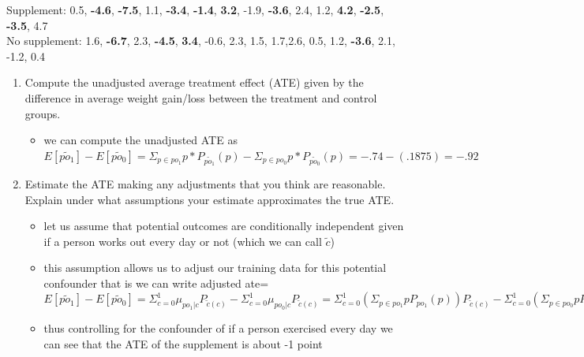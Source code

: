 \documentclass[12pt,twoside]{article}
\begin{document}
\begin{enumerate}
Supplement: 0.5, \textbf{-4.6}, \textbf{-7.5}, 1.1, \textbf{-3.4}, \textbf{-1.4}, \textbf{3.2}, -1.9, \textbf{-3.6}, 2.4, 1.2, \textbf{4.2}, \textbf{-2.5}, \textbf{-3.5}, 4.7 \\ 
No supplement: 1.6, \textbf{-6.7}, 2.3, \textbf{-4.5}, \textbf{3.4}, -0.6, 2.3, 1.5, 1.7,2.6, 0.5, 1.2, \textbf{-3.6}, 2.1, -1.2, 0.4
\begin{enumerate}
\item Compute the unadjusted average treatment effect (ATE) given by the difference in average weight gain/loss between the treatment and control groups. 
\begin{itemize}
    \item  we can compute the unadjusted ATE as $E[\tilde{po_{1}}]-E[\tilde{po_{0}}]=\Sigma_{p\in po_1}p*P_{\tilde{po_{1}}}(p)-\Sigma_{p\in po_0}p*P_{\tilde{po_{0}}}(p)=-.74-(.1875)=-.92$
\end{itemize}

\item Estimate the ATE making any adjustments that you think are reasonable. Explain under what assumptions your estimate approximates the true ATE. 
\begin{itemize}
    \item let us assume that potential outcomes are conditionally independent given if a person works out every day or not (which we can call $\tilde{c}$)
    \item this assumption allows us to adjust our training data for this potential confounder that is we can write adjusted ate= $E[\tilde{po_{1}}]-E[\tilde{po_{0}}]=\Sigma_{c=0}^{1}\mu_{po_1|c}P_{\tilde{c}(c)}-\Sigma_{c=0}^{1}\mu_{po_0|c}P_{\tilde{c}(c)}=\Sigma_{c=0}^{1}(\Sigma_{p\in po_1}pP_{po_1}(p))P_{\tilde{c}(c)}-\Sigma_{c=0}^{1}(\Sigma_{p\in po_0}pP_{po_0}(p))P_{\tilde{c}(c)}=\frac{13}{31}(-2.12)+\frac{18}{31}1.33-\frac{13}{31}(-2.85)-\frac{18}{31}1.2=0.38161$
    \item thus controlling for the confounder of if a person exercised every day we can see that the ATE of the supplement is about -1 point 
\end{itemize}

\end{enumerate}



\end{enumerate}
\end{document}
